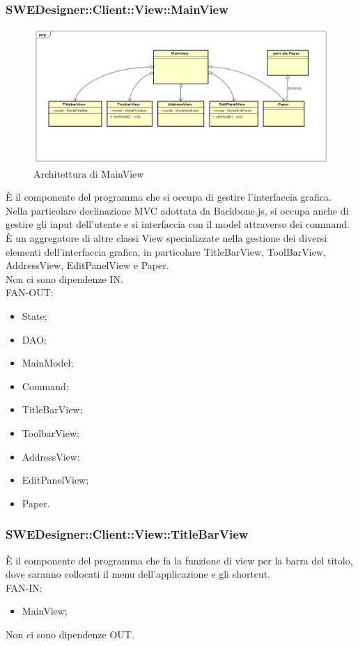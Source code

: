 \documentclass[../PianoDiQualifica.tex]{subfiles}
\begin{document}
		\subsubsection{SWEDesigner::Client::View::MainView}
			\begin{figure}[H]\label{fig:MainModel}
				\centering
				\includegraphics[scale=0.44]{Immagini/DiagrammaArchitettura/MainView.png}
				\caption{Architettura di MainView}
			\end{figure}
		È il componente del programma che si occupa di gestire l'interfaccia grafica. Nella particolare declinazione MVC adottata da Backbone.js, si occupa anche di gestire gli input dell'utente e si interfaccia con il model attraverso dei command. È un aggregatore di altre classi View specializzate nella gestione dei diversi elementi dell'interfaccia grafica, in particolare TitleBarView, ToolBarView, AddressView, EditPanelView e Paper.\\
		Non ci sono dipendenze IN.\\
			FAN-OUT:
			\begin{itemize}
				\item State;
				\item DAO;
				\item MainModel;
				\item Command;
				\item TitleBarView;
				\item ToolbarView;
				\item AddressView;
				\item EditPanelView;
				\item Paper.
			\end{itemize}
		\subsubsection{SWEDesigner::Client::View::TitleBarView}
		È il componente del programma che fa la funzione di view per la barra del titolo, dove saranno collocati il menu dell’applicazione e gli shortcut.\\
		FAN-IN:
		\begin{itemize}
			\item MainView;
		\end{itemize}
		Non ci sono dipendenze OUT.
\end{document}
